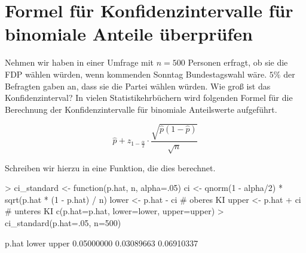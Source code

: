 
\renewenvironment{Schunk}{\vspace{10pt}}{\vspace{8pt}}   

\section{Formel für Konfidenzintervalle für binomiale Anteile überprüfen}

Nehmen wir haben in einer Umfrage mit $n=500$ Personen erfragt, ob sie die FDP wählen würden, wenn kommenden Sonntag Bundestagswahl wäre. $5\%$ der Befragten gaben an, dass sie die Partei wählen würden. Wie groß ist das Konfidenzinterval? In vielen Statistikehrbüchern wird folgenden Formel für die Berechnung der Konfidenzintervalle für binomiale Anteilswerte aufgeführt. 

\begin{equation} \label{eq:prop_standard}
\hat p + z_{1- \frac{\alpha}{2}} \cdot \frac{\sqrt{\hat p(1-\hat p)}}{\sqrt{n}}
\end{equation}

  
Schreiben wir hierzu in \R{} eine Funktion, die dies berechnet.

\begin{Schunk}
\begin{Sinput}
> ci_standard <- function(p.hat, n, alpha=.05){
   ci <- qnorm(1 - alpha/2) * sqrt(p.hat * (1 - p.hat) / n) 
   lower <- p.hat - ci                       # oberes KI            
   upper <- p.hat + ci                       # unteres KI
   c(p.hat=p.hat, lower=lower, upper=upper)
 }  
> ci_standard(p.hat=.05, n=500)
\end{Sinput}
\begin{Soutput}
     p.hat      lower      upper 
0.05000000 0.03089663 0.06910337 
\end{Soutput}
\end{Schunk}

